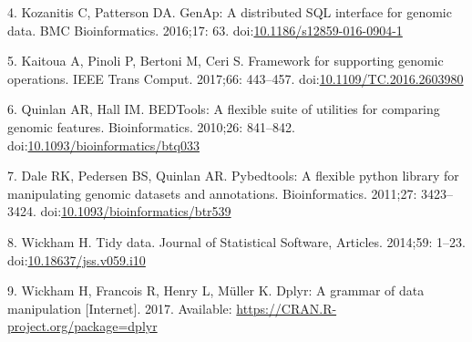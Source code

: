 \documentclass[10pt,letterpaper]{article}
\begin{document}
\leavevmode\hypertarget{ref-Kozanitis2016-bm}{}%
4. Kozanitis C, Patterson DA. GenAp: A distributed SQL interface for
genomic data. BMC Bioinformatics. 2016;17: 63.
doi:\href{https://doi.org/10.1186/s12859-016-0904-1}{10.1186/s12859-016-0904-1}

\leavevmode\hypertarget{ref-Kaitoua2017-pw}{}%
5. Kaitoua A, Pinoli P, Bertoni M, Ceri S. Framework for supporting
genomic operations. IEEE Trans Comput. 2017;66: 443--457.
doi:\href{https://doi.org/10.1109/TC.2016.2603980}{10.1109/TC.2016.2603980}

\leavevmode\hypertarget{ref-Quinlan2010-gc}{}%
6. Quinlan AR, Hall IM. BEDTools: A flexible suite of utilities for
comparing genomic features. Bioinformatics. 2010;26: 841--842.
doi:\href{https://doi.org/10.1093/bioinformatics/btq033}{10.1093/bioinformatics/btq033}

\leavevmode\hypertarget{ref-Dale2011-js}{}%
7. Dale RK, Pedersen BS, Quinlan AR. Pybedtools: A flexible python
library for manipulating genomic datasets and annotations.
Bioinformatics. 2011;27: 3423--3424.
doi:\href{https://doi.org/10.1093/bioinformatics/btr539}{10.1093/bioinformatics/btr539}

\leavevmode\hypertarget{ref-Wickham2014-jc}{}%
8. Wickham H. Tidy data. Journal of Statistical Software, Articles.
2014;59: 1--23.
doi:\href{https://doi.org/10.18637/jss.v059.i10}{10.18637/jss.v059.i10}

\leavevmode\hypertarget{ref-Wickham2017-dplyr}{}%
9. Wickham H, Francois R, Henry L, Müller K. Dplyr: A grammar of data
manipulation {[}Internet{]}. 2017. Available:
\url{https://CRAN.R-project.org/package=dplyr}

\nolinenumbers
\end{document}
